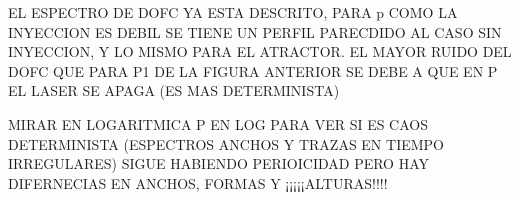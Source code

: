 EL ESPECTRO DE DOFC YA ESTA DESCRITO, PARA p COMO LA INYECCION ES DEBIL SE TIENE UN PERFIL PARECDIDO AL CASO SIN INYECCION, Y LO MISMO PARA EL ATRACTOR. EL MAYOR RUIDO DEL DOFC QUE PARA P1 DE LA FIGURA ANTERIOR SE DEBE A QUE EN P EL LASER SE APAGA (ES MAS DETERMINISTA)

MIRAR EN LOGARITMICA P EN LOG PARA VER SI ES CAOS DETERMINISTA (ESPECTROS ANCHOS Y TRAZAS EN TIEMPO IRREGULARES) SIGUE HABIENDO PERIOICIDAD PERO HAY DIFERNECIAS EN ANCHOS, FORMAS Y ¡¡¡¡¡ALTURAS!!!! 
